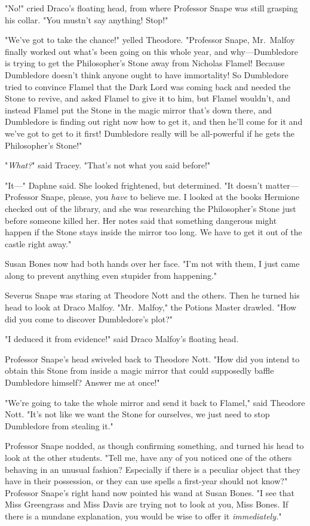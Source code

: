 "No!" cried Draco's floating head, from where Professor Snape was still
grasping his collar. "You mustn't say anything! Stop!"

"We've got to take the chance!" yelled Theodore. "Professor Snape, Mr.~Malfoy
finally worked out what's been going on this whole year, and why—Dumbledore
is trying to get the Philosopher's Stone away from Nicholas Flamel! Because
Dumbledore doesn't think anyone ought to have immortality! So Dumbledore tried
to convince Flamel that the Dark Lord was coming back and needed the Stone to
revive, and asked Flamel to give it to him, but Flamel wouldn't, and instead
Flamel put the Stone in the magic mirror that's down there, and Dumbledore is
finding out right now how to get it, and then he'll come for it and we've got
to get to it first! Dumbledore really will be all-powerful if he gets the
Philosopher's Stone!"

"\emph{What?}" said Tracey. "That's not what you said before!"

"It—" Daphne said. She looked frightened, but determined. "It doesn't
matter—Professor Snape, please, you \emph{have} to believe me. I looked at
the books Hermione checked out of the library, and she was researching the
Philosopher's Stone just before someone killed her. Her notes said that
something dangerous might happen if the Stone stays inside the mirror too long.
We have to get it out of the castle right away."

Susan Bones now had both hands over her face. "I'm not with them, I just came
along to prevent anything even stupider from happening."

Severus Snape was staring at Theodore Nott and the others. Then he turned his
head to look at Draco Malfoy. "Mr.~Malfoy," the Potions Master drawled. "How
did you come to discover Dumbledore's plot?"

"I deduced it from evidence!" said Draco Malfoy's floating head.

Professor Snape's head swiveled back to Theodore Nott. "How did you intend to
obtain this Stone from inside a magic mirror that could supposedly baffle
Dumbledore himself? Answer me at once!"

"We're going to take the whole mirror and send it back to Flamel," said
Theodore Nott. "It's not like we want the Stone for ourselves, we just need to
stop Dumbledore from stealing it."

Professor Snape nodded, as though confirming something, and turned his head to
look at the other students. "Tell me, have any of you noticed one of the others
behaving in an unusual fashion? Especially if there is a peculiar object that
they have in their possession, or they can use spells a first-year should not
know?" Professor Snape's right hand now pointed his wand at Susan Bones. "I see
that Miss Greengrass and Miss Davis are trying not to look at you, Miss Bones.
If there is a mundane explanation, you would be wise to offer it
\emph{immediately.}"

